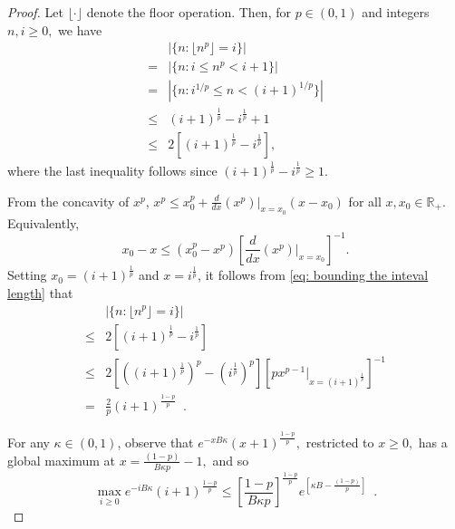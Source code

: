 \documentclass[usenames,dvipsnames,final,12pt]{colt2018} %
\newcommand{\gugan}[1]{#1}
\begin{document}
\begin{proof}
	\gugan{Let $\lfloor \cdot \rfloor$ denote the floor operation. Then, for $p \in (0, 1)$ and integers $n, i \geq 0,$ we have
		\begin{align}
		&|\{n :  \lfloor n^{{p}}\rfloor = i\}|
		\\ = & |\{n: i \leq n^p < i + 1\}| \nonumber
		\\ = & |\{n: i^{1/p} \leq n < (i + 1)^{1/p}\}| \nonumber
		\\ \leq & (i+1)^\frac{1}{p} - i^\frac{1}{p} + 1 \nonumber
		\\ \leq & 2\left[(i+1)^\frac{1}{p} - i^\frac{1}{p}\right],\label{eq: bounding the inteval length}
		\end{align}%
		where the last inequality follows since $(i+1)^\frac{1}{p} - i^\frac{1}{p} \geq 1$.
	}
	
	From the concavity of $x^p$, $x^p \leq x_0 ^p + \frac{d}{dx}(x^p)\big|_{x=x_0}(x-x_0)$ for all $x,x_0 \in \mathbb{R_+}.$ Equivalently,
	$$
	x_0 - x \leq (x_0^p - x^p)\left[\frac{d}{dx}(x^p)\big|_{x=x_0}\right]^{-1}.
	$$
	\gugan{Setting $x_0=(i+1)^{\frac{1}{p}}$ and $x=i^{\frac{1}{p}}$, it follows from \eqref{eq: bounding the inteval length} that}
	\begin{align}
	&|\{n :  \lfloor n^{{p}}\rfloor = i\} | \nonumber\\ \leq & 2\left[(i+1)^\frac{1}{p} - i^\frac{1}{p}\right] \nonumber\\ \leq & 2\left[\left((i+1)^\frac{1}{p}\right)^p - \left(i^\frac{1}{p}\right)^p\right]\left[px^{p-1}\big|_{x=(i+1)^{\frac{1}{p}}}\right]^{-1}  \nonumber\\ = &\frac{2}{p}(i + 1)^{\frac{1- p}{p}} \enspace. \label{calculus bound}
	\end{align}
	
	For any $\kappa \in (0,1)$, \gugan{observe that}
	$e^{ - x B\kappa} (x + 1)^{\frac{1 - p}{p}},$ \gugan{restricted to $x \geq 0,$} has a \gugan{global maximum} at $x=\frac{(1-p)}{B\kappa p}-1,$ and so
	\begin{equation}
	\label{eq: bounding the max term}
	\max_{i \geq 0} e^{ - i B\kappa} (i + 1)^{\frac{1 - p}{p}}
	\! \leq \! \left[\frac{1- p}{B\kappa p}\right]^{\frac{1 - {p}}{{p}}} \! \! \! e^{[\kappa B-\frac{(1-p)}{p}]} \enspace.
	\end{equation}
	

\end{proof}
\end{document}
